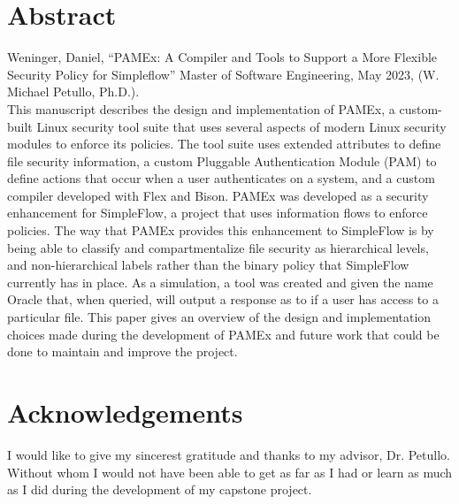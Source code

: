 \documentclass[letterpaper,12pt]{report}
\begin{document}
	
\clearpage


\clearpage

\setcounter{page}{1}
\renewcommand\arraystretch{1.5}

\vspace*{0.5in}
\section*{Abstract}
Weninger, Daniel, ``PAMEx: A Compiler and Tools to Support a 
More Flexible Security Policy for Simpleflow'' Master of Software 
Engineering, May 2023, (W. Michael Petullo, Ph.D.). \\

This manuscript describes the design and implementation of PAMEx, a custom-built Linux security tool 
suite that uses several aspects of modern Linux security modules to enforce its policies. 
The tool suite uses extended attributes to define file security information, a custom Pluggable Authentication Module (PAM) 
to define actions that occur when a user authenticates on a system, 
and a custom compiler developed with Flex and Bison. PAMEx was developed as a security enhancement for SimpleFlow, 
a project that uses information flows to enforce policies. The way that PAMEx provides this enhancement to SimpleFlow 
is by being able to classify and compartmentalize file security as hierarchical levels, and non-hierarchical labels 
rather than the binary policy that SimpleFlow currently has in place. 
As a simulation, a tool was created and given the name Oracle that, when queried, 
will output a response as to if a user has access to a particular file. This paper gives an overview of the design and 
implementation choices made during the development of PAMEx and future work that could be done to maintain and improve the project. 
\clearpage

\vspace*{0.5in}
\section*{Acknowledgements}
\par 
\hspace{1em}
I would like to give my sincerest gratitude and thanks to my advisor, Dr. Petullo. Without whom I would not have been able to get as far as I had or learn as much as I did during the development of my capstone project.
\clearpage
\end{document}
